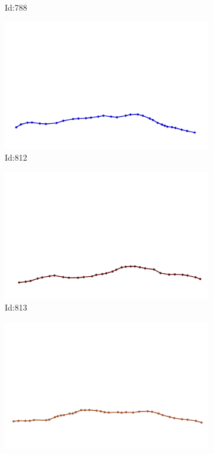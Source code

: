 \documentclass[12pt,twoside]{report}
\begin{document}
\begin{figure}
\begin{subfigure}[b]{0.20\textwidth}
\caption{Id:788}
\end{subfigure}
\begin{subfigure}[b]{0.20\textwidth}
\centering
\includegraphics[width=\textwidth]{../trajectories/812.png}
\caption{Id:812}
\end{subfigure}
\begin{subfigure}[b]{0.20\textwidth}
\centering
\includegraphics[width=\textwidth]{../trajectories/813.png}
\caption{Id:813}
\end{subfigure}
\begin{subfigure}[b]{0.20\textwidth}
\centering
\includegraphics[width=\textwidth]{../trajectories/817.png}

\end{subfigure}
\end{figure}
\end{document}
